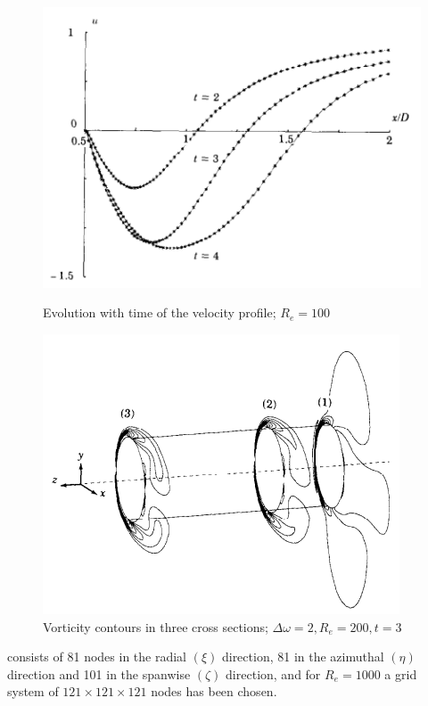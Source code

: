 \documentclass[11pt]{report}
\begin{document}
	\begin{figure}[!h]
		\centering
		\begin{minipage}{.4\textwidth}
			\centering
			\includegraphics[width=1\linewidth]{graph_3}
			\caption{Evolution with time of the velocity profile; $R_e=100$}
			\label{fig:4_3}
		\end{minipage}
		\begin{minipage}{.3\textwidth}
			\centering
			\includegraphics[width=1.3\linewidth]{graph_4}
			\caption{Vorticity contours in three cross sections; $\Delta\omega = 2, R_e=200, t=3$}
			\label{fig:4_4}
		\end{minipage}
	\end{figure}
	consists of 81 nodes in the radial $(\xi)$ direction, 81 in the azimuthal $(\eta)$ direction and 101 in the spanwise $(\zeta)$ direction, and for $R_e = 1000$ a grid system of $121 \times 121 \times 121$ nodes has been chosen.\\
	
\end{document}
